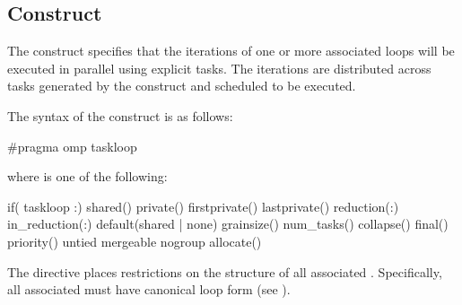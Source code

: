 \subsection{ Construct}
\label{subsec:taskloop Construct}
\summary
The  construct specifies that the iterations of one or more associated loops will be executed in parallel using explicit tasks. The iterations are distributed across tasks generated by the construct and scheduled to be executed.
\syntax
\begin{ccppspecific}
The syntax of the  construct is as follows:
\begin{ompcPragma}
#pragma omp taskloop 
\end{ompcPragma}
where  is one of the following:
\begin{indentedcodelist}
if(\plc{[} taskloop :\plc{] scalar-expr})
shared()
private()
firstprivate()
lastprivate()
reduction(:)
in_reduction(:)
default(shared \textnormal{|} none)
grainsize()
num_tasks()
collapse()
final()
priority()
untied
mergeable
nogroup
allocate(\plc{[allocator: ]})
\end{indentedcodelist}

The  directive places restrictions on the structure of all associated . Specifically, all associated  must have canonical loop form (see ).
\end{ccppspecific}

